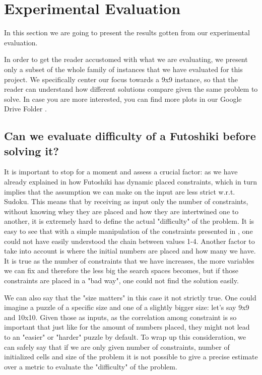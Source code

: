\section{Experimental Evaluation}
\label{sec:evaluation}

In this section we are going to present the results gotten from our experimental evaluation.



In order to get the reader accustomed with what we are evaluating, we present only a subset of the whole family of instances that we have evaluated for this project. We specifically center our focus towards a 9x9 instance, so that the reader can understand how different solutions compare given the same problem to solve. In case you are more interested, you can find more plots in our Google Drive Folder \cite{drive}.


\subsection{Can we evaluate difficulty of a Futoshiki before solving it?}
\label{subsec:futoshiki_difficulty}
It is important to stop for a moment and assess a crucial factor: as we have already explained in  how Futoshiki has dynamic placed constraints, which in turn implies that the assumption we can make on the input are less strict w.r.t. Sudoku. This means that by receiving as input only the number of constraints, without knowing whey they are placed and how they are intertwined one to another, it is extremely hard to define the actual "difficulty" of the problem. It is easy to see that with a simple manipulation of the constraints presented in , one could not have easily understood the chain between values 1-4. Another factor to take into account is where the initial numbers are placed and how many we have. It is true as the number of constraints that we have increases, the more variables we can fix and therefore the less big the search spaces becomes, but if those constraints are placed in a "bad way", one could not find the solution easily.

We can also say that the "size matters" in this case it not strictly true. One could imagine a puzzle of a specific size and one of a slightly bigger size: let's say 9x9 and 10x10. Given those as inputs, as the correlation among constraint is so important that just like for the amount of numbers placed, they might not lead to an "easier" or "harder" puzzle by default.
To wrap up this consideration, we can safely say that if we are only given number of constraints, number of initialized cells and size of the problem it is not possible to give a precise estimate over a metric to evaluate the "difficulty" of the problem.

